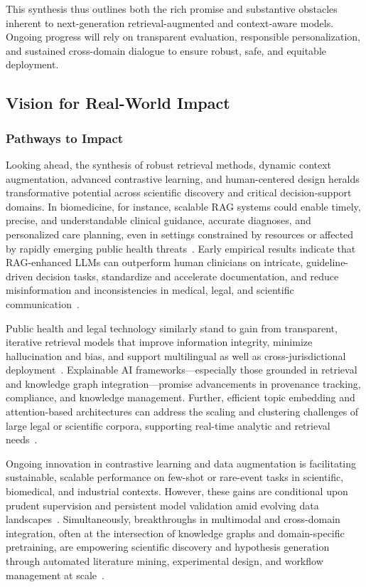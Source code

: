 \documentclass[sigconf]{acmart}
\begin{document}
This synthesis thus outlines both the rich promise and substantive obstacles inherent to next-generation retrieval-augmented and context-aware models. Ongoing progress will rely on transparent evaluation, responsible personalization, and sustained cross-domain dialogue to ensure robust, safe, and equitable deployment.

\subsection{Vision for Real-World Impact}

\subsubsection{Pathways to Impact}

Looking ahead, the synthesis of robust retrieval methods, dynamic context augmentation, advanced contrastive learning, and human-centered design heralds transformative potential across scientific discovery and critical decision-support domains. In biomedicine, for instance, scalable RAG systems could enable timely, precise, and understandable clinical guidance, accurate diagnoses, and personalized care planning, even in settings constrained by resources or affected by rapidly emerging public health threats~\cite{ref1, ref2, ref5, ref9, ref11}. Early empirical results indicate that RAG-enhanced LLMs can outperform human clinicians on intricate, guideline-driven decision tasks, standardize and accelerate documentation, and reduce misinformation and inconsistencies in medical, legal, and scientific communication~\cite{ref6, ref8, ref22, ref36, ref40}.

Public health and legal technology similarly stand to gain from transparent, iterative retrieval models that improve information integrity, minimize hallucination and bias, and support multilingual as well as cross-jurisdictional deployment~\cite{ref10, ref20, ref36, ref38}. Explainable AI frameworks—especially those grounded in retrieval and knowledge graph integration—promise advancements in provenance tracking, compliance, and knowledge management. Further, efficient topic embedding and attention-based architectures can address the scaling and clustering challenges of large legal or scientific corpora, supporting real-time analytic and retrieval needs~\cite{ref13, ref19, ref21}.

Ongoing innovation in contrastive learning and data augmentation is facilitating sustainable, scalable performance on few-shot or rare-event tasks in scientific, biomedical, and industrial contexts. However, these gains are conditional upon prudent supervision and persistent model validation amid evolving data landscapes~\cite{ref58, ref59, ref60}. Simultaneously, breakthroughs in multimodal and cross-domain integration, often at the intersection of knowledge graphs and domain-specific pretraining, are empowering scientific discovery and hypothesis generation through automated literature mining, experimental design, and workflow management at scale~\cite{ref12, ref15, ref19, ref24, ref61}.
\end{document}
